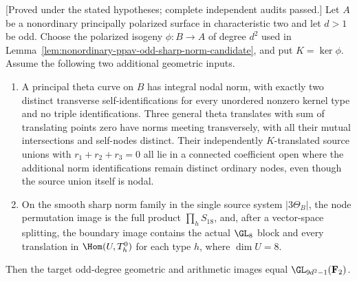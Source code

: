 \begin{theorem}
\label{thm:three-theta-conditional-full-image-candidate}
\textup{[Proved under the stated hypotheses; complete independent audits passed.]}
Let $A$ be a nonordinary principally polarized surface in
characteristic two and let $d>1$ be odd. Choose the polarized
isogeny $\phi:B\to A$ of degree $d^2$ used in
Lemma~\ref{lem:nonordinary-ppav-odd-sharp-norm-candidate}, and put
$K=\ker\phi$. Assume the following two additional geometric inputs.
\begin{enumerate}
\item A principal theta curve on $B$ has integral nodal norm, with
exactly two distinct transverse self-identifications for every
unordered nonzero kernel type and no triple identifications.
Three general theta translates with sum of translating points zero
have norms meeting transversely, with all their mutual intersections
and self-nodes distinct. Their independently $K$-translated source
unions with $r_1+r_2+r_3=0$ all lie in a connected coefficient open
where the additional norm identifications remain distinct ordinary
nodes, even though the source union itself is nodal.
\item On the smooth sharp norm family in the single source system
$|3\Theta_B|$, the node permutation image is the full product
$\prod_hS_{18}$, and, after a vector-space splitting, the boundary
image contains the actual $\GL_8$ block and every translation in
$\Hom(U,T_h^0)$ for each type $h$, where $\dim U=8$.
\end{enumerate}
Then the target odd-degree geometric and arithmetic images equal
$\GL_{9d^2-1}(\mathbf F_2)$.
\end{theorem}
